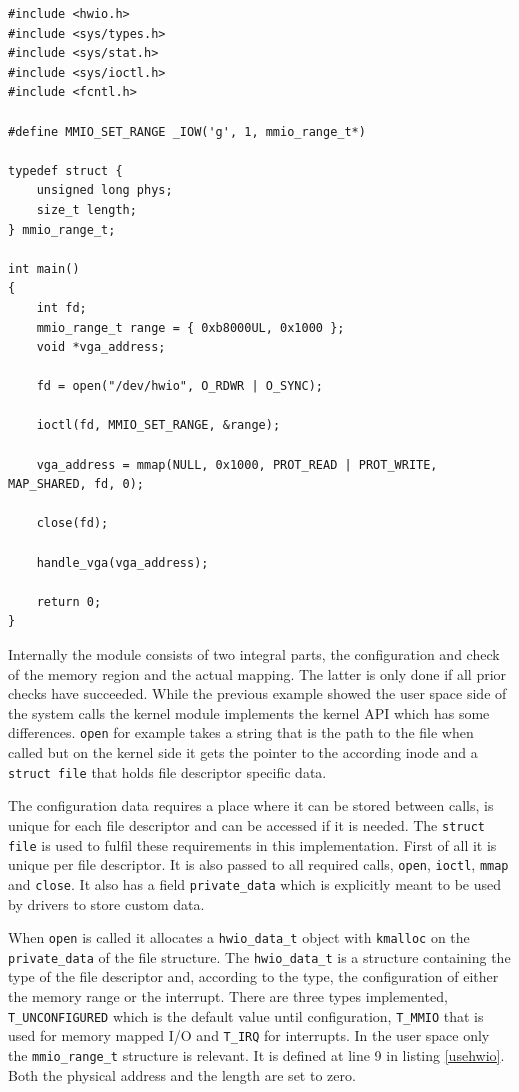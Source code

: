 \documentclass[
a4paper,
11pt,
twoside
]{report}
\begin{document}
		\begin{lstlisting}[basicstyle=\ttfamily\footnotesize]
#include <hwio.h>
#include <sys/types.h>
#include <sys/stat.h>
#include <sys/ioctl.h>
#include <fcntl.h>

#define MMIO_SET_RANGE _IOW('g', 1, mmio_range_t*)

typedef struct {
	unsigned long phys;
	size_t length;
} mmio_range_t;

int main()
{
	int fd;
	mmio_range_t range = { 0xb8000UL, 0x1000 };
	void *vga_address;
	
	fd = open("/dev/hwio", O_RDWR | O_SYNC);
	
	ioctl(fd, MMIO_SET_RANGE, &range);
	
	vga_address = mmap(NULL, 0x1000, PROT_READ | PROT_WRITE, MAP_SHARED, fd, 0);
	
	close(fd);
	
	handle_vga(vga_address);
	
	return 0;
}
		\end{lstlisting}
		
		Internally the module consists of two integral parts, the configuration and check of the memory region and the actual mapping.
		The latter is only done if all prior checks have succeeded.
		While the previous example showed the user space side of the system calls the kernel module implements the kernel API which has some differences.
		\texttt{open} for example takes a string that is the path to the file when called but on the kernel side it gets the pointer to the according inode and a \texttt{struct file} that holds file descriptor specific data.
		
		The configuration data requires a place where it can be stored between calls, is unique for each file descriptor and can be accessed if it is needed.
		The \texttt{struct file} is used to fulfil these requirements in this implementation.
		First of all it is unique per file descriptor.
		It is also passed to all required calls, \texttt{open}, \texttt{ioctl}, \texttt{mmap} and \texttt{close}.
		It also has a field \texttt{private\_data} which is explicitly meant to be used by drivers to store custom data.
		
		When \texttt{open} is called it allocates a \texttt{hwio\_data\_t} object with \texttt{kmalloc} on the \texttt{private\_data} of the file structure.
		The \texttt{hwio\_data\_t} is a structure containing the type of the file descriptor and, according to the type, the configuration of either the memory range or the interrupt.
		There are three types implemented, \texttt{T\_UNCONFIGURED} which is the default value until configuration, \texttt{T\_MMIO} that is used for memory mapped I/O and \texttt{T\_IRQ} for interrupts.
		In the user space only the \texttt{mmio\_range\_t} structure is relevant.
		It is defined at line 9 in listing \ref{usehwio}.
		Both the physical address and the length are set to zero.
		
\end{document}
